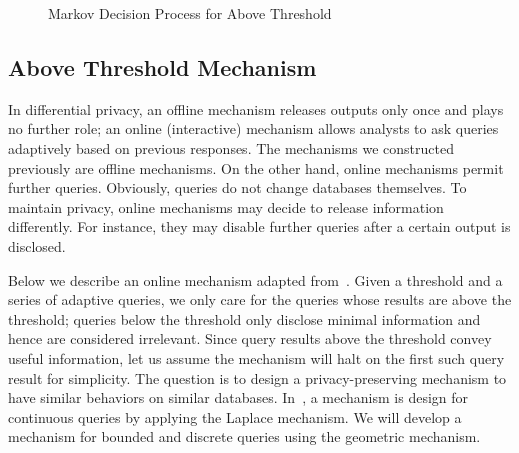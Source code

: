 \begin{figure}
{
    }
  \caption{Markov Decision Process for Above Threshold}
  \label{figure:mdp-above-threshold}
\end{figure}


\subsection{Above Threshold Mechanism}
\label{subsec:threshold}
In differential privacy, an offline mechanism releases outputs only
once and plays no further role; an online (interactive) mechanism
allows analysts to ask queries adaptively based on previous
responses. The mechanisms we constructed previously are offline
mechanisms. On the other hand, online mechanisms permit further queries. 
Obviously, queries do not change databases themselves. To maintain
privacy, online mechanisms may decide to release
information differently. For instance, they may disable further
queries after a certain output is disclosed.

Below we describe an online mechanism adapted from~\cite{DR:14:AFDP}.
Given a threshold and a series of adaptive queries, we only care for
the queries whose results are above the threshold; queries below the
threshold only disclose minimal information and hence are considered
irrelevant. Since query results above the threshold convey useful
information, let us assume the mechanism will halt on the first such
query result for simplicity. The question is to design a
privacy-preserving mechanism to have similar behaviors on similar
databases. In~\cite{DR:14:AFDP}, a mechanism is design for continuous
queries by applying the Laplace mechanism. We will develop a mechanism
for bounded and discrete queries using the geometric mechanism.

